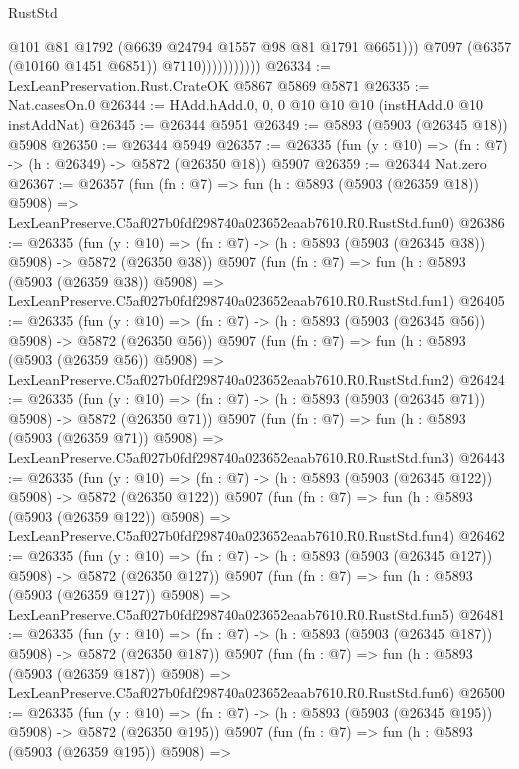 \begin{lexlean}{RustStd}
\begin{coremodule}
                              @101
                              @81
                              @1792
                              (@6639 @24794 @1557 @98 @81 @1791 @6651)))
                          @7097
                          (@6357 (@10160 @1451 @6851))
                          @7110)))))))))))
@26334 := LexLeanPreservation.Rust.CrateOK @5867 @5869 @5871
@26335 := Nat.casesOn.{0}
@26344 := HAdd.hAdd.{0, 0, 0} @10 @10 @10 (instHAdd.{0} @10 instAddNat)
@26345 := @26344 @5951
@26349 := @5893 (@5903 (@26345 @18)) @5908
@26350 := @26344 @5949
@26357 := @26335 (fun (y : @10) => (fn : @7) -> (h : @26349) -> @5872 (@26350 @18)) @5907
@26359 := @26344 Nat.zero
@26367 := @26357
    (fun (fn : @7) =>
    fun (h : @5893 (@5903 (@26359 @18)) @5908) =>
    LexLeanPreserve.C5af027b0fdf298740a023652eaab7610.R0.RustStd.fun0)
@26386 := @26335
    (fun (y : @10) => (fn : @7) -> (h : @5893 (@5903 (@26345 @38)) @5908) -> @5872 (@26350 @38))
    @5907
    (fun (fn : @7) =>
    fun (h : @5893 (@5903 (@26359 @38)) @5908) =>
    LexLeanPreserve.C5af027b0fdf298740a023652eaab7610.R0.RustStd.fun1)
@26405 := @26335
    (fun (y : @10) => (fn : @7) -> (h : @5893 (@5903 (@26345 @56)) @5908) -> @5872 (@26350 @56))
    @5907
    (fun (fn : @7) =>
    fun (h : @5893 (@5903 (@26359 @56)) @5908) =>
    LexLeanPreserve.C5af027b0fdf298740a023652eaab7610.R0.RustStd.fun2)
@26424 := @26335
    (fun (y : @10) => (fn : @7) -> (h : @5893 (@5903 (@26345 @71)) @5908) -> @5872 (@26350 @71))
    @5907
    (fun (fn : @7) =>
    fun (h : @5893 (@5903 (@26359 @71)) @5908) =>
    LexLeanPreserve.C5af027b0fdf298740a023652eaab7610.R0.RustStd.fun3)
@26443 := @26335
    (fun (y : @10) => (fn : @7) -> (h : @5893 (@5903 (@26345 @122)) @5908) -> @5872 (@26350 @122))
    @5907
    (fun (fn : @7) =>
    fun (h : @5893 (@5903 (@26359 @122)) @5908) =>
    LexLeanPreserve.C5af027b0fdf298740a023652eaab7610.R0.RustStd.fun4)
@26462 := @26335
    (fun (y : @10) => (fn : @7) -> (h : @5893 (@5903 (@26345 @127)) @5908) -> @5872 (@26350 @127))
    @5907
    (fun (fn : @7) =>
    fun (h : @5893 (@5903 (@26359 @127)) @5908) =>
    LexLeanPreserve.C5af027b0fdf298740a023652eaab7610.R0.RustStd.fun5)
@26481 := @26335
    (fun (y : @10) => (fn : @7) -> (h : @5893 (@5903 (@26345 @187)) @5908) -> @5872 (@26350 @187))
    @5907
    (fun (fn : @7) =>
    fun (h : @5893 (@5903 (@26359 @187)) @5908) =>
    LexLeanPreserve.C5af027b0fdf298740a023652eaab7610.R0.RustStd.fun6)
@26500 := @26335
    (fun (y : @10) => (fn : @7) -> (h : @5893 (@5903 (@26345 @195)) @5908) -> @5872 (@26350 @195))
    @5907
    (fun (fn : @7) =>
    fun (h : @5893 (@5903 (@26359 @195)) @5908) =>

\end{coremodule}
\end{lexlean}
